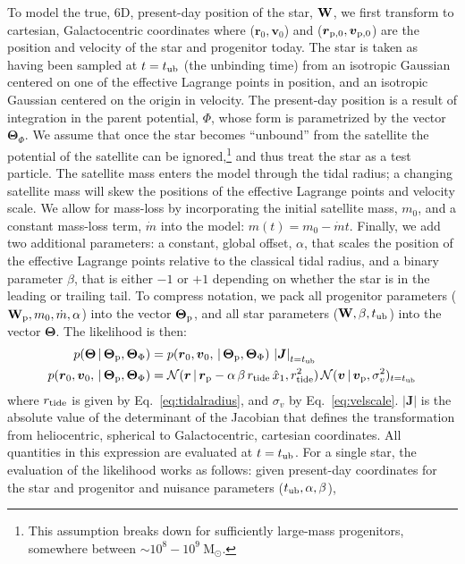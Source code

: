 \documentclass[letterpaper,12pt,preprint]{aastex}
\newcommand{\given}{\,|\,}
\newcommand{\W}{{\bf W}}
\newcommand{\J}{{\boldsymbol J}}
\newcommand{\rtide}{r_{\rm tide}}
\newcommand{\bs}{\boldsymbol}
\newcommand{\sat}{{\rm p}}
\newcommand{\tub}{t_{\rm ub}}
\newcommand{\tailbit}{\beta}
\newcommand{\Loffset}{\alpha}
\begin{document}
To model the true, 6D, present-day position of the star, $\W$, we first transform to cartesian, Galactocentric coordinates where ($\bs{r}_0,\bs{v}_0$) and ($\bs{r}_{\sat,0},\bs{v}_{\sat,0}$) are the position and velocity of the star and progenitor today. The star is taken as having been sampled at $t=\tub$ (the unbinding time) from an isotropic Gaussian centered on one of the effective Lagrange points in position, and an isotropic Gaussian centered on the origin in velocity. The present-day position is a result of integration in the parent potential, $\Phi$, whose form is parametrized by the vector $\bs{\Theta}_\Phi$. We assume that once the star becomes ``unbound'' from the satellite the potential of the satellite can be ignored,\footnote{This assumption breaks down for sufficiently large-mass progenitors, somewhere between $\sim10^8-10^9~$M$_\odot$.} and thus treat the star as a test particle. The satellite mass enters the model through the tidal radius; a changing satellite mass will skew the positions of the effective Lagrange points and velocity scale. We allow for mass-loss by incorporating the initial satellite mass, $m_0$, and a constant mass-loss term, $\dot{m}$ into the model: $m(t) = m_0 - \dot{m}t$. Finally, we add two additional parameters: a constant, global offset, $\Loffset$, that scales the position of the effective Lagrange points relative to the classical tidal radius, and a binary parameter $\tailbit$, that is either $-1$ or $+1$ depending on whether the star is in the leading or trailing tail. To compress notation, we pack all progenitor parameters ($\W_\sat, m_0, \dot{m}, \Loffset$) into the vector $\bs{\Theta}_\sat$, and all star parameters ($\W, \tailbit, \tub$) into the vector $\bs{\Theta}$. The likelihood is then:
\begin{align}
	p(\bs{\Theta} \given \bs{\Theta}_\sat, \bs{\Theta}_\Phi) &= p(\bs{r}_0,\bs{v}_0, \given \bs{\Theta}_\sat, \bs{\Theta}_\Phi)\,\left\vert\J\right\vert_{t=\tub}\label{eq:starlike}\\
	p(\bs{r}_0,\bs{v}_0, \given \bs{\Theta}_\sat, \bs{\Theta}_\Phi) &= \mathcal{N}(\bs{r} \given \bs{r}_\sat - \Loffset\,\tailbit\,\rtide\,\hat{x}_1, \rtide^2)\,\mathcal{N}(\bs{v} \given \bs{v}_\sat, \sigma^2_v)_{t=\tub}
\end{align}
where $\rtide$ is given by Eq.~\ref{eq:tidalradius}, and $\sigma_v$ by Eq.~\ref{eq:velscale}. $\left\vert\J\right\vert$ is the absolute value of the determinant of the Jacobian that defines the transformation from heliocentric, spherical to Galactocentric, cartesian coordinates. All quantities in this expression are evaluated at $t=\tub$. For a single star, the evaluation of the likelihood works as follows: given present-day coordinates for the star and progenitor and nuisance parameters ($\tub,\Loffset,\tailbit$),
\end{document}
